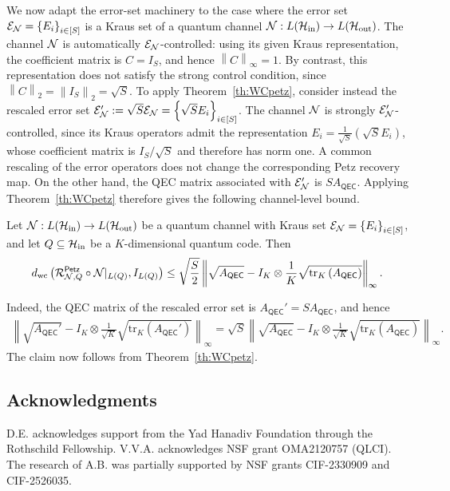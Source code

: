 \documentclass[10pt]{article}
\newcommand{\SIN}{\mathrm{in}}
\newcommand{\SOUT}{\mathrm{out}}
\newcommand{\tr}{\mathrm{tr}}
\newcommand{\p}[1]{\left(#1\right)}
\newcommand{\ppp}[1]{\left\{#1\right\}}
\newcommand{\norm}[1]{\left\|#1\right\|}
\newcommand{\s}[1]{\mathsf{#1}}
\begin{document}
 
We now adapt the error-set machinery to the case where the error set $\calE_{\calN}=\ppp{E_i}_{i\in[S]}$ is a Kraus set of a quantum channel $\calN:L(\calH_{\SIN})\to L(\calH_{\SOUT})$. The channel ${\cal N}$ is automatically ${\cal E}_{{\cal N}}$-controlled: using its given Kraus representation, the coefficient matrix is $C=I_S$, and hence $\norm{C}_{\infty}=1$. By contrast, this representation does not satisfy the strong control condition, since $ \norm{C}_{2} = \norm{I_S}_{2} = \sqrt{S}$. To apply Theorem~\ref{th:WCpetz}, consider instead the rescaled error set $\calE_{\calN}' := \sqrt{S}\calE_{\calN} = \ppp{\sqrt{S}E_i}_{i\in[S]}$. The channel ${\cal N}$ is strongly ${\cal E}_{{\cal N}}'$-controlled, since its Kraus operators admit the representation $E_i = \frac{1}{\sqrt{S}}\p{\sqrt{S}E_i}$, whose coefficient matrix is $I_S/\sqrt{S}$ and therefore has norm one. A common rescaling of the error operators does not change the corresponding Petz recovery map. On the other hand, the QEC matrix associated with ${\cal E}_{{\cal N}}'$ is $S A_{\s{QEC}}$. Applying Theorem~\ref{th:WCpetz} therefore gives the following channel-level bound. 

\begin{prop}\label{prop:channelWCPetz} Let $\calN:L(\calH_{\SIN})\to L(\calH_{\SOUT})$ be a quantum channel with Kraus set $\calE_{\calN}=\ppp{E_i}_{i\in[S]}$, and let $Q\subseteq\calH_{\SIN}$ be a $K$-dimensional quantum code. Then 
\[d_{\mathrm{wc}}\p{ \calR_{\calN,Q}^{\s{Petz}} \circ \calN|_{L(Q)}, I_{L(Q)} } \leq \sqrt{\frac{S}{2}} \norm{ \sqrt{A_{\s{QEC}}} - I_K\otimes \frac{1}{K} \sqrt{\tr_K\p{A_{\s{QEC}}}} }_{\infty}. \]\end{prop} Indeed, the QEC matrix of the rescaled error set is $A_{\s{QEC}}' = S A_{\s{QEC}} $, and hence \begin{align*}
     \norm{ \sqrt{A_{\s{QEC}}'} - I_K\otimes \frac{1}{\sqrt{K}} \sqrt{\tr_K\p{A_{\s{QEC}}'}} }_{\infty} = \sqrt{S} \norm{ \sqrt{A_{\s{QEC}}} - I_K\otimes \frac{1}{\sqrt{K}} \sqrt{\tr_K\p{A_{\s{QEC}}}} }_{\infty}. 
\end{align*} The claim now follows from Theorem~\ref{th:WCpetz}.

\subsection*{Acknowledgments}
  D.E. acknowledges support from the Yad Hanadiv Foundation through the Rothschild Fellowship.   
  V.V.A. acknowledges NSF grant OMA2120757 (QLCI).   
  The research of A.B. was partially supported by NSF grants CIF-2330909 and CIF-2526035. 
\end{document}
